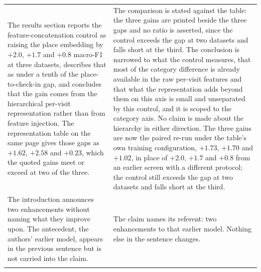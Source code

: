 \begin{table}[htb]
\begin{tabular}{@{}p{}p{}@{}}
The results section reports the feature-concatenation control as raising the place
embedding by $+2.0$, $+1.7$ and $+0.8$ macro-F1 at three datasets, describes that as
under a tenth of the place-to-check-in gap, and concludes that the gain comes from the
hierarchical per-visit representation rather than from feature injection. The
representation table on the same page gives those gaps as $+1.62$, $+2.58$ and $+0.23$,
which the quoted gains meet or exceed at two of the three. &
The comparison is stated against the table: the three gains are printed beside the three
gaps and no ratio is asserted, since the control exceeds the gap at two datasets and falls
short at the third. The conclusion is narrowed to what the control measures, that most of
the category difference is already available in the raw per-visit features and that what
the representation adds beyond them on this axis is small and unseparated by this control,
and it is scoped to the category axis. No claim is made about the hierarchy in either
direction. The three gains are now the paired re-run under the table's own training configuration, $+1.73$,
$+1.70$ and $+1.02$, in place of $+2.0$, $+1.7$ and $+0.8$ from an earlier screen with a
different protocol; the control still exceeds the gap at two datasets and falls short at the
third. \\
\addlinespace
The introduction announces two enhancements without naming what they improve upon. The
antecedent, the authors' earlier model, appears in the previous sentence but is not
carried into the claim. &
The claim names its referent: two enhancements to that earlier model. Nothing else in the
sentence changes. \\
\addlinespace

\end{tabular}
\end{table}
